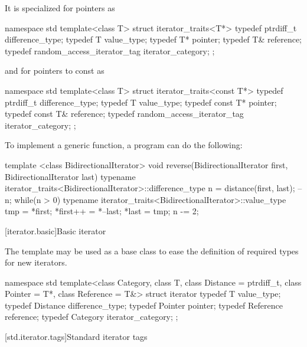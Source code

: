 \pnum
It is specialized for pointers as

\begin{codeblock}
namespace std {
  template<class T> struct iterator_traits<T*> {
    typedef ptrdiff_t difference_type;
    typedef T value_type;
    typedef T* pointer;
    typedef T& reference;
    typedef random_access_iterator_tag iterator_category;
  };
}
\end{codeblock}

and for pointers to const as

\begin{codeblock}
namespace std {
  template<class T> struct iterator_traits<const T*> {
    typedef ptrdiff_t difference_type;
    typedef T value_type;
    typedef const T* pointer;
    typedef const T& reference;
    typedef random_access_iterator_tag iterator_category;
  };
}
\end{codeblock}

\pnum
\enterexample
To implement a generic
function, a \Cpp program can do the following:

\begin{codeblock}
template <class BidirectionalIterator>
void reverse(BidirectionalIterator first, BidirectionalIterator last) {
  typename iterator_traits<BidirectionalIterator>::difference_type n =
    distance(first, last);
  --n;
  while(n > 0) {
    typename iterator_traits<BidirectionalIterator>::value_type
     tmp = *first;
    *first++ = *--last;
    *last = tmp;
    n -= 2;
  }
}
\end{codeblock}
\exitexample

[iterator.basic]{Basic iterator}

\pnum
The
template may be used as a base class to ease the definition of required types
for new iterators.

\begin{codeblock}
namespace std {
  template<class Category, class T, class Distance = ptrdiff_t,
    class Pointer = T*, class Reference = T&>
  struct iterator {
    typedef T         value_type;
    typedef Distance  difference_type;
    typedef Pointer   pointer;
    typedef Reference reference;
    typedef Category  iterator_category;
  };
}
\end{codeblock}

[std.iterator.tags]{Standard iterator tags}

